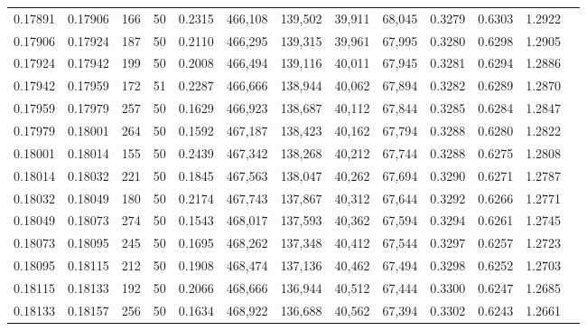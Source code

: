 \begin{tabular}{rrrrrrrrrrrrr}
0.17891 & 0.17906 &   166 &  50 &                                     0.2315 & 466,108 & 139,502 &  39,911 &  68,045 & 0.3279 & 0.6303 & 1.2922 \\
0.17906 & 0.17924 &   187 &  50 &                                     0.2110 & 466,295 & 139,315 &  39,961 &  67,995 & 0.3280 & 0.6298 & 1.2905 \\
0.17924 & 0.17942 &   199 &  50 &                                     0.2008 & 466,494 & 139,116 &  40,011 &  67,945 & 0.3281 & 0.6294 & 1.2886 \\
0.17942 & 0.17959 &   172 &  51 &                                     0.2287 & 466,666 & 138,944 &  40,062 &  67,894 & 0.3282 & 0.6289 & 1.2870 \\
0.17959 & 0.17979 &   257 &  50 &                                     0.1629 & 466,923 & 138,687 &  40,112 &  67,844 & 0.3285 & 0.6284 & 1.2847 \\
0.17979 & 0.18001 &   264 &  50 &                                     0.1592 & 467,187 & 138,423 &  40,162 &  67,794 & 0.3288 & 0.6280 & 1.2822 \\
0.18001 & 0.18014 &   155 &  50 &                                     0.2439 & 467,342 & 138,268 &  40,212 &  67,744 & 0.3288 & 0.6275 & 1.2808 \\
0.18014 & 0.18032 &   221 &  50 &                                     0.1845 & 467,563 & 138,047 &  40,262 &  67,694 & 0.3290 & 0.6271 & 1.2787 \\
0.18032 & 0.18049 &   180 &  50 &                                     0.2174 & 467,743 & 137,867 &  40,312 &  67,644 & 0.3292 & 0.6266 & 1.2771 \\
0.18049 & 0.18073 &   274 &  50 &                                     0.1543 & 468,017 & 137,593 &  40,362 &  67,594 & 0.3294 & 0.6261 & 1.2745 \\
0.18073 & 0.18095 &   245 &  50 &                                     0.1695 & 468,262 & 137,348 &  40,412 &  67,544 & 0.3297 & 0.6257 & 1.2723 \\
0.18095 & 0.18115 &   212 &  50 &                                     0.1908 & 468,474 & 137,136 &  40,462 &  67,494 & 0.3298 & 0.6252 & 1.2703 \\
0.18115 & 0.18133 &   192 &  50 &                                     0.2066 & 468,666 & 136,944 &  40,512 &  67,444 & 0.3300 & 0.6247 & 1.2685 \\
0.18133 & 0.18157 &   256 &  50 &                                     0.1634 & 468,922 & 136,688 &  40,562 &  67,394 & 0.3302 & 0.6243 & 1.2661 \\

\end{tabular}
